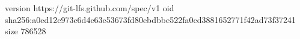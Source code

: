 version https://git-lfs.github.com/spec/v1
oid sha256:a0ed12c973c6d4e63e53673fd80ebdbbe522fa0cd3881652771f42ad73f37241
size 786528
